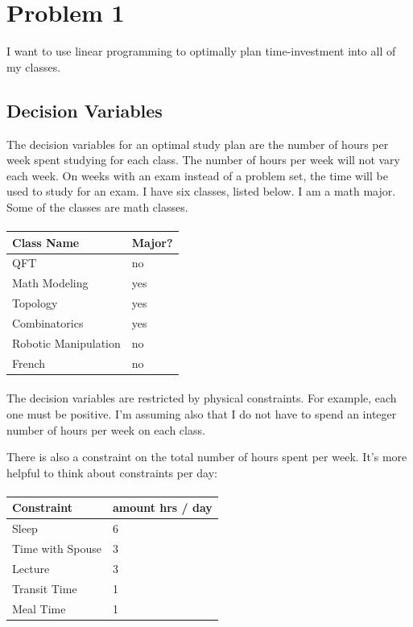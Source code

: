 \documentclass{article}
\begin{document}
\section{Problem 1}

I want to use linear programming to optimally plan
	time-investment into all of my classes.

\subsection{Decision Variables}
The decision variables for an optimal study plan are the
	number of hours per week spent studying for each
	class.
The number of hours per week will not vary each week.
On weeks with an exam instead of a problem set, the time
	will be used to study for an exam.
I have six classes, listed below.
I am a math major.
Some of the classes are math classes.

\paragraph{}
\begin{tabular}{|l|l|}
\hline
Class Name & Major? \\
\hline
QFT & no\\
\hline
Math Modeling & yes \\
\hline
Topology & yes \\
\hline
Combinatorics & yes \\
\hline
Robotic Manipulation & no \\
\hline
French & no \\
\hline
\end{tabular}

\paragraph{}
The decision variables are restricted by physical constraints.
For example, each one must be positive.
I'm assuming also that I do not have to spend an integer number of
	hours per week on each class.

There is also a constraint on the total number of hours spent per week.
It's more helpful to think about constraints per day:

\paragraph{}
\begin{tabular}{|l|l|}
\hline
Constraint & amount hrs / day \\
\hline
Sleep & 6 \\
\hline
Time with Spouse & 3 \\
\hline
Lecture & 3 \\
\hline
Transit Time & 1 \\
\hline
Meal Time & 1 \\
\hline 
\end{tabular}
\end{document}
